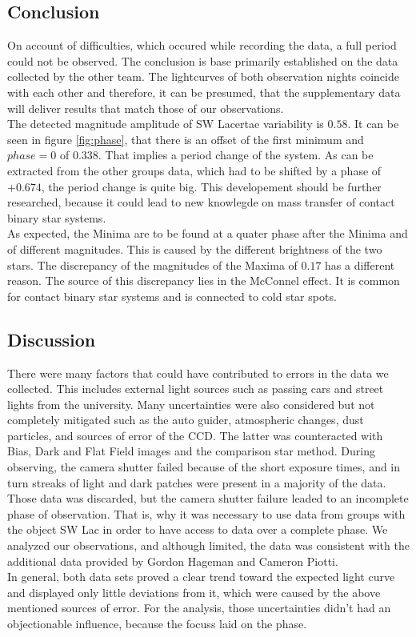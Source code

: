 \subsection{Conclusion}
  \label{sec:fuckoff}
  On account of difficulties, which occured while recording the data, a full period could not
  be observed. The conclusion is base primarily established on the data collected by the other team.
  The lightcurves of both observation nights coincide with each other and therefore, 
  it can be presumed, that the supplementary data will deliver results that match those of our 
  observations.\\
  \noindent The detected magnitude amplitude of SW Lacertae variability is $0.58$. 
  It can be seen in figure \ref{fig:phase}, that there is an offset of the first minimum 
  and $phase = 0$ of $ 0.338$. That implies a period change of the system. As can be extracted from
  the other groups data, which had to be shifted by a phase of 
  $+0.674$, the period change is quite big. This developement should be 
  further researched, because it could lead to new knowlegde on mass transfer of contact binary
  star systems.\\
  \noindent As expected, the Minima are to be found at a quater phase after the Minima and
  of different magnitudes. This is caused by the different brightness
  of the two stars. The discrepancy of the magnitudes of the Maxima of $0.17$ has a different reason. The source 
  of this discrepancy lies in the McConnel effect. It is common for contact binary star systems 
  and is connected to cold star spots.

\subsection{Discussion}
  \label{sec:orange}
  \noindent There were many factors that could have contributed to errors in the data we collected. 
  This includes external light sources such as
  passing cars and street lights from the university. Many uncertainties were also considered but not 
  completely mitigated such as the auto guider, atmospheric changes, dust particles, and sources of error of the CCD.
  The latter was counteracted with Bias, Dark and Flat Field images and the comparison star method.
  During observing, the camera shutter failed 
  because of the short exposure times, 
  and in turn streaks of light and dark patches were present in a majority of the data. Those data
  was discarded, but the camera shutter failure leaded to an incomplete phase of observation.
  That is, why it was necessary to use data from groups with the object SW Lac
  in order to have access to data over a complete phase. We analyzed our observations, and although limited, 
  the data was consistent with the additional 
  data provided by Gordon Hageman and Cameron Piotti. \\
  In general, both data sets proved a clear trend toward the expected light curve and displayed only little
  deviations from it, which were caused by the above mentioned sources of error. For the analysis, those 
  uncertainties didn't had an objectionable influence, because the focuss laid on the phase.
  
